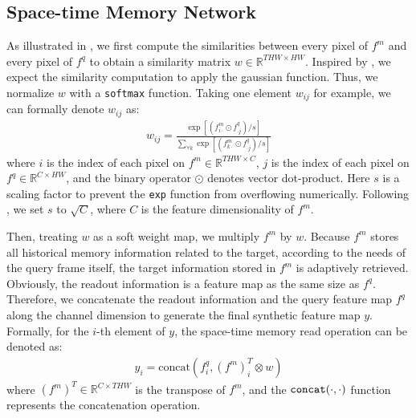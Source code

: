 \documentclass[final]{cvpr}
\begin{document}
\subsection{Space-time Memory Network}\label{subsec:space-time-memory-reader}
As illustrated in , we first compute the similarities between every pixel of $f^{m}$ and every pixel of $f^{q}$ to obtain a similarity matrix $w \in \mathbb{R}^{THW \times HW}$.
Inspired by \cite{wang2018non}, we expect the similarity computation to apply the gaussian function.
Thus, we normalize $w$ with a \verb!softmax! function.
Taking one element $w_{ij}$ for example, we can formally denote $w_{ij}$ as:
\begin{equation}\label{eq:memory-read-eq1}
\begin{split}
w_{ij}=\frac{\exp\left[\left(f^{m}_{i \cdot} \odot f^{q}_{\cdot j}\right) / s\right]}{\sum\limits_{\forall k}\exp\left[\left(f^{m}_{k \cdot} \odot f^{q}_{\cdot j}\right) / s\right]}
\end{split}
\end{equation}
where $i$ is the index of each pixel on $f^m \in \mathbb{R}^{THW \times C}$, $j$ is the index of each pixel on $f^q \in \mathbb{R}^{C \times HW}$, and the binary operator $\odot$ denotes vector dot-product.
Here $s$ is a scaling factor to prevent the \verb!exp! function from overflowing numerically.
Following \cite{Vaswani2017AttentionIA}, we set $s$ to $\sqrt{C}$, where $C$ is the feature dimensionality of $f^{m}$.

Then, treating $w$ as a soft weight map, we multiply $f^{m}$ by $w$.
Because $f^{m}$ stores all historical memory information related to the target, according to the needs of the query frame itself, the target information stored in $f^{m}$ is adaptively retrieved.
Obviously, the readout information is a feature map as the same size as $f^{q}$.
Therefore, we concatenate the readout information and the query feature map $f^{q}$ along the channel dimension to generate the final synthetic feature map $y$.
Formally, for the $i$-th element of $y$, the space-time memory read operation can be denoted as:
\begin{equation}\label{eq:memory-read}
\begin{split}
y_{i}=\text{concat}\left(f^{q}_{i}, (f^{m})^{T}_{i} \otimes w \right)
\end{split}
\end{equation}
where $(f^{m})^{T} \in \mathbb{R}^{C \times THW}$ is the transpose of $f^{m}$, and the $\verb!concat!(\cdot, \cdot)$ function represents the concatenation operation.
\end{document}
